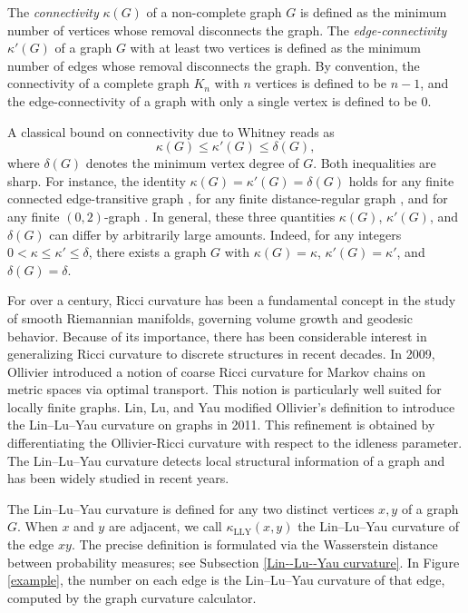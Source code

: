 \documentclass[11pt,bezier]{article}
\theoremstyle{definition}
\theoremstyle{definition}
\theoremstyle{nonumber}
\begin{document}
The \textit{connectivity} $\kappa(G)$ of a non-complete graph $G$ is defined as the minimum number of vertices whose removal disconnects the graph.
The \textit{edge-connectivity} $\kappa'(G)$ of a graph $G$ with at least two vertices is defined as the minimum number of edges whose removal disconnects the graph.
By convention, the connectivity of a complete graph $K_n$ with $n$ vertices is defined to be $n-1$, and the edge-connectivity of a graph with only a single vertex is defined to be $0$. 

A classical bound on connectivity due to Whitney \cite{Whitney1932} reads as
$$
\kappa(G) \leq \kappa'(G) \leq \delta(G),
$$
where $\delta(G)$ denotes the minimum vertex degree of $G$. 
Both inequalities are sharp. For instance, the identity $\kappa(G)=\kappa'(G)=\delta(G)$ holds for any finite connected edge-transitive graph \cite{Mader1971, Watkins1970}, for any finite distance-regular graph \cite{BrouwerHaemers2005, BrouwerKoolen2009, BrouwerMenser1985}, and for any finite $(0,2)$-graph \cite{BrouwerMulder1997}. 
In general, these three quantities $\kappa(G)$, $\kappa'(G)$, and $\delta(G)$ can differ by arbitrarily large amounts. Indeed, for any integers $0 < \kappa \leq \kappa' \leq \delta$, there exists a graph $G$ with $\kappa(G)=\kappa$, $\kappa'(G)=\kappa'$, and $\delta(G)=\delta$.

For over a century, Ricci curvature has been a fundamental concept in the study of smooth Riemannian manifolds, governing volume growth and geodesic behavior. 
Because of its importance, there has been considerable interest in generalizing Ricci curvature to discrete structures in recent decades. 
In 2009, Ollivier \cite{Ollivier} introduced a notion of coarse Ricci curvature for Markov chains on metric spaces via optimal transport. This notion is particularly well suited for locally finite graphs. Lin, Lu, and Yau \cite{LLY} modified Ollivier's definition to introduce the Lin--Lu--Yau curvature on graphs in 2011. This refinement is obtained by differentiating the Ollivier-Ricci curvature with respect to the idleness parameter. The Lin--Lu--Yau curvature detects local structural information of a graph and has been widely studied in recent years. 

The Lin--Lu--Yau curvature is defined for any two distinct vertices $x,y$ of a graph $G$. When $x$ and $y$ are adjacent, we call $\kappa_{\mathrm{LLY}}(x,y)$ the Lin--Lu--Yau curvature of the edge $xy$.
The precise definition is formulated via the Wasserstein distance between probability measures; see Subsection \ref{Lin--Lu--Yau curvature}. In Figure \ref{example}, the number on each edge is the Lin--Lu--Yau curvature of that edge, computed by the graph curvature calculator\cite{Cushing2022}.
\end{document}
